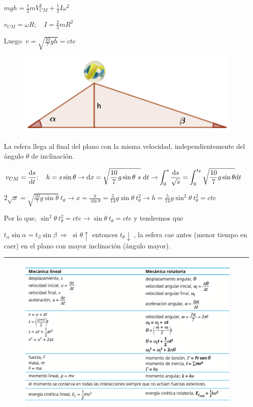 \begin{multicols}{2}
$mgh=\frac 1 2 m V_{CM}^2+\frac 1 2 I \omega^2$

$v_{CM}=\omega R;\quad I=\frac 2 5 mR^2$

Luego $\ v=\sqrt{\frac {10}{7}gh}=cte$
\begin{figure}[H]
	\centering
	\includegraphics[width=.4\textwidth]{imagenes/imagenes16/T16IM24.png}
\end{figure}	
\end{multicols}
La esfera llega al final del plano con la misma velocidad, independientemente del ángulo $\theta$ de inclinación.

$v_{CM}=\displaystyle \dv{s}{t}; \quad h=s \sin \theta \to \dd x= \sqrt{\frac {10}{7}g \sin \theta \ s }\ \dd t \to \int_0^s \frac{\dd s}{\sqrt{s}}=\int_0^{t_\theta} \sqrt{\frac {10}{7}g\sin \theta}\dd t$

$\displaystyle 2\sqrt{x}= \sqrt{\frac {10}{7}g\sin \theta} \ t_\theta \to x=\frac {h}{\sin \theta}=\frac 5{14} g \sin \theta \ t^2_\theta \to h=\frac 5{14} g \sin^2 \theta \ t^2_\theta =cte$

Por lo que, $\sin^2 \theta \ t_\theta^2=cte \to \sin \theta \ t_{\theta}=cte$ y tendremos que

$t_\alpha \sin \alpha = t_\beta \sin \beta \ \Rightarrow \ \text{ si } \theta \uparrow \text{ entonces } t_\theta \downarrow\ $, la esfera cae antes (menor tiempo en caer) en el plano con mayor inclinación (ángulo mayor).


\rule{5cm}{0.3pt}
\vspace{1cm}
\begin{figure}[H]
	\centering
	\includegraphics[width=1\textwidth]{imagenes/imagenes16/T16IM25.png}
\end{figure}



